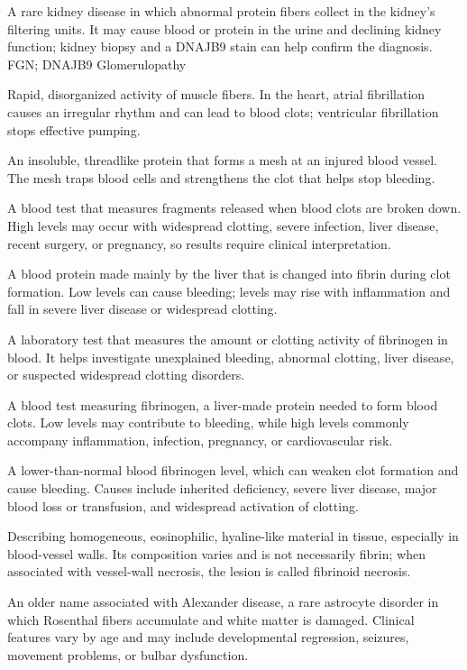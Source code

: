  A rare kidney disease in which abnormal protein fibers collect in the kidney’s filtering units. It may cause blood or protein in the urine and declining kidney function; kidney biopsy and a DNAJB9 stain can help confirm the diagnosis.
\synonyms
FGN; DNAJB9 Glomerulopathy

 Rapid, disorganized activity of muscle fibers. In the heart, atrial fibrillation causes an irregular rhythm and can lead to blood clots; ventricular fibrillation stops effective pumping.

 An insoluble, threadlike protein that forms a mesh at an injured blood vessel. The mesh traps blood cells and strengthens the clot that helps stop bleeding.

 A blood test that measures fragments released when blood clots are broken down. High levels may occur with widespread clotting, severe infection, liver disease, recent surgery, or pregnancy, so results require clinical interpretation.

 A blood protein made mainly by the liver that is changed into fibrin during clot formation. Low levels can cause bleeding; levels may rise with inflammation and fall in severe liver disease or widespread clotting.

 A laboratory test that measures the amount or clotting activity of fibrinogen in blood. It helps investigate unexplained bleeding, abnormal clotting, liver disease, or suspected widespread clotting disorders.

 A blood test measuring fibrinogen, a liver-made protein needed to form blood clots. Low levels may contribute to bleeding, while high levels commonly accompany inflammation, infection, pregnancy, or cardiovascular risk.

 A lower-than-normal blood fibrinogen level, which can weaken clot formation and cause bleeding. Causes include inherited deficiency, severe liver disease, major blood loss or transfusion, and widespread activation of clotting.

 Describing homogeneous, eosinophilic, hyaline-like material in tissue, especially in blood-vessel walls. Its composition varies and is not necessarily fibrin; when associated with vessel-wall necrosis, the lesion is called fibrinoid necrosis.

 An older name associated with Alexander disease, a rare astrocyte disorder in which Rosenthal fibers accumulate and white matter is damaged. Clinical features vary by age and may include developmental regression, seizures, movement problems, or bulbar dysfunction.

